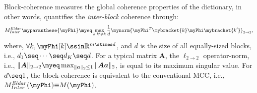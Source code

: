 Block-coherence measures the global coherence properties of the dictionary, in other words, quantifies the \emph{inter-block} coherence through:
\begin{equation}
\label{eq:Eldar-Block-coherence} 
M^{Eldar}_{Inter}\myparanthese{\myPhi} \myeq \displaystyle\max_{k,k' \neq k} \frac1d \mynorm{\myPhi ^T \mybracket{k} \myPhi \mybracket{k'}}_{2 \to 2},
\end{equation}
where, $\forall k,\myPhi[k] \ssin \mathbb{R}^{m \stimes d}$, and $d$ is the size of all equally-sized blocks, i.e., $d_1 \seq \cdots \seq d_K \seq d$.
For a typical matrix $\boldsymbol{A}$, the $\ell_{2 {\to} 2}$ operator-norm, i.e., $\Vert \boldsymbol{A} \Vert_{2 {\to} 2} {\myeq} \max_{\Vert \boldsymbol{a} \Vert_2 \leq 1} \Vert\boldsymbol{A} \boldsymbol{a} \Vert_{2}$, is equal to its maximum singular value. 
For $d \seq 1$, the block-coherence is equivalent to the conventional MCC, i.e., $M^{Eldar}_{Inter}(\myPhi) {\equiv}M(\myPhi)$.